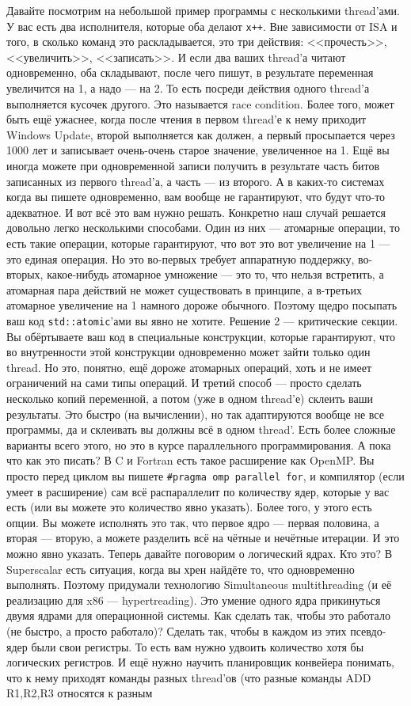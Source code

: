 \documentclass{article}
\begin{document}
    Давайте посмотрим на небольшой пример программы с несколькими thread'ами. У вас есть два исполнителя, которые оба делают \texttt{x++}. Вне зависимости от ISA и того, в сколько команд это раскладывается, это три действия: <<прочесть>>, <<увеличить>>, <<записать>>. И если два ваших thread'а читают одновременно, оба складывают, после чего пишут, в результате переменная увеличится на 1, а надо --- на 2. То есть посреди действия одного thread'а выполняется кусочек другого. Это называется race condition. Более того, может быть ещё ужаснее, когда после чтения в первом thread'е к нему приходит Windows Update, второй выполняется как должен, а первый просыпается через 1000 лет и записывает очень-очень старое значение, увеличенное на 1. Ещё вы иногда можете при одновременной записи получить в результате часть битов записанных из первого thread'а, а часть --- из второго. А в каких-то системах когда вы пишете одновременно, вам вообще не гарантируют, что будут что-то адекватное. И вот всё это вам нужно решать. Конкретно наш случай решается довольно легко несколькими способами. Один из них --- атомарные операции, то есть такие операции, которые гарантируют, что вот это вот увеличение на 1 --- это единая операция. Но это во-первых требует аппаратную поддержку, во-вторых, какое-нибудь атомарное умножение --- это то, что нельзя встретить, а атомарная пара действий не может существовать в принципе, а в-третьих атомарное увеличение на 1 намного дороже обычного. Поэтому щедро посыпать ваш код \texttt{std::atomic}'ами вы явно не хотите. Решение 2 --- критические секции. Вы обёртываете ваш код в специальные конструкции, которые гарантируют, что во внутренности этой конструкции одновременно может зайти только один thread. Но это, понятно, ещё дороже атомарных операций, хоть и не имеет ограничений на сами типы операций. И третий способ --- просто сделать несколько копий переменной, а потом (уже в одном thread'е) склеить ваши результаты. Это быстро (на вычислении), но так адаптируются вообще не все программы, да и склеивать вы должны всё в одном thread'. Есть более сложные варианты всего этого, но это в курсе параллельного программирования. А пока что как это писать? В C и Fortran есть такое расширение как OpenMP. Вы просто перед циклом вы пишете \texttt{#pragma omp parallel for}, и компилятор (если умеет в расширение) сам всё распараллелит по количеству ядер, которые у вас есть (или вы можете это количество явно указать). Более того, у этого есть опции. Вы можете исполнять это так, что первое ядро --- первая половина, а вторая --- вторую, а можете разделить всё на чётные и нечётные итерации. И это можно явно указать. Теперь давайте поговорим о логический ядрах. Кто это? В Superscalar есть ситуация, когда вы хрен найдёте то, что одновременно выполнять. Поэтому придумали технологию Simultaneous multithreading (и её реализацию для x86 --- hypertreading). Это умение одного ядра прикинуться двумя ядрами для операционной системы. Как сделать так, чтобы это работало (не быстро, а просто работало)? Сделать так, чтобы в каждом из этих псевдо-ядер были свои регистры. То есть вам нужно удвоить количество хотя бы логических регистров. И ещё нужно научить планировщик конвейера понимать, что к нему приходят команды разных thread'ов (что разные команды ADD R1,R2,R3 относятся к разным 
\end{document}
